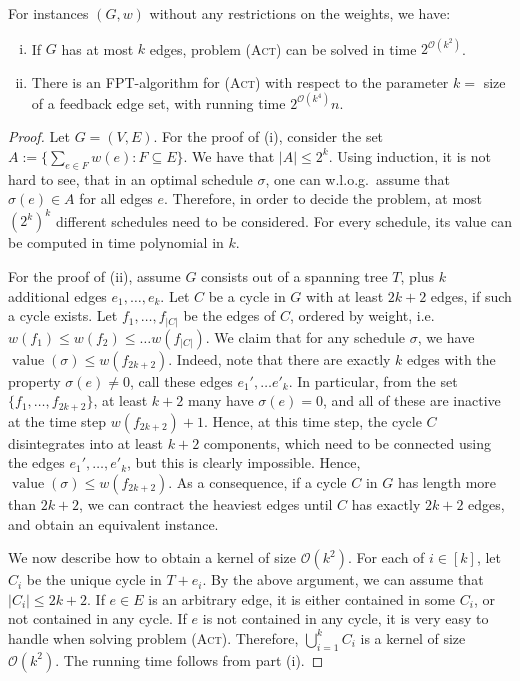 \documentclass[runningheads]{llncs}
\numberwithin{equation}{section}
\newcommand{\set}[1]{\{ #1 \}}
\newcommand{\fromto}[2]{\set{#1, \ldots, #2}}
\newcommand{\bigO}{\mathcal{O}}
\newcommand{\act}{\textsc{(Act)}}
\DeclareMathOperator{\val}{\text{value}}
\begin{document}
\begin{theorem}
For instances $(G, w)$ without any restrictions on the weights, we have: 
\begin{enumerate}[(i)]
\item If $G$ has at most $k$ edges, problem {\act} can be solved in time $2^{\bigO(k^2)}$.
\item There is an  FPT-algorithm for {\act} with respect to the parameter $k =$ size of a feedback edge set, with running time $2^{\bigO(k^4)}n$. 

\end{enumerate}
\end{theorem}

\begin{proof}
Let $G = (V, E)$. For the proof of (i), consider the set $A := \set{\sum_{e \in F}w(e) : F \subseteq E}$. We have that $|A| \leq 2^k$. Using induction, it is not hard to see, that in an optimal schedule $\sigma$, one can w.l.o.g.\ assume that $\sigma(e) \in A$ for all edges $e$. Therefore, in order to decide the problem, at most $(2^k)^k$ different schedules need to be considered. For every schedule, its value can be computed in time polynomial in $k$. 

For the proof of (ii), assume $G$ consists out of a spanning tree $T$, plus $k$ additional edges $e_1, \dots, e_k$. Let $C$ be a cycle in $G$ with at least $2k+2$ edges, if such a cycle exists. Let $f_1, \dots, f_{|C|}$ be the edges of $C$, ordered by weight, i.e.\ $w(f_1) \leq w(f_2) \leq \dots w(f_{|C|})$. We claim that for any schedule $\sigma$, we have $\val(\sigma) \leq w(f_{2k+2})$. Indeed, note that there are exactly $k$ edges with the property $\sigma(e) \neq 0$, call these edges $e_1', \dots e'_k$. In particular, from the set $\fromto{f_1}{f_{2k+2}}$, at least $k+2$ many have $\sigma(e) = 0$, and all of these are inactive at the time step $w(f_{2k+2}) + 1$. Hence, at this time step, the cycle $C$ disintegrates into at least $k+2$ components, which need to be connected using the edges $e_1', \dots, e'_k$, but this is clearly impossible. Hence, $\val(\sigma) \leq w(f_{2k+2})$. As a consequence, if a cycle $C$ in $G$ has length more than $2k+2$, we can contract the heaviest edges until $C$ has exactly $2k+2$ edges, and obtain an equivalent instance.

We now describe how to obtain a kernel of size $\bigO(k^2)$. For each of $i \in [k]$, let $C_i$ be the unique cycle in $T + e_i$. By the above argument, we can assume that $|C_i| \leq 2k+2$. If $e \in E$ is an arbitrary edge, it is either contained in some $C_i$, or not contained in any cycle. If $e$ is not contained in any cycle, it is very easy to handle when solving problem {\act}. Therefore, $\bigcup_{i=1}^k C_i$ is a kernel of size $\bigO(k^2)$. The running time follows from part (i).


\end{proof}
\end{document}
